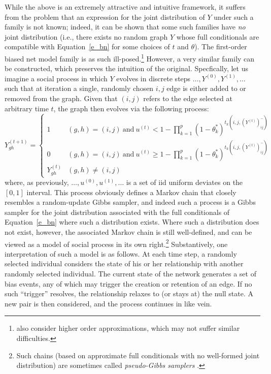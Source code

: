 \documentclass[11pt]{article}
\begin{document}
While the above is an extremely attractive and intuitive framework, it suffers from the problem that an expression for the joint distribution of $Y$ under such a family is not known; indeed, it can be shown that some such families have \emph{no} joint distribution (i.e., there exists no random graph $Y$ whose full conditionals are compatible with Equation~\ref{e_bn} for some choices of $t$ and $\theta$).  The first-order biased net model family is as such ill-posed.\footnote{\citet{skvoretz.et.al:sn:2004} also consider higher order approximations, which may not suffer similar difficulties.}  However, a very similar family can be constructed, which preserves the intuition of the original.  Specfically, let us imagine a social process in which $Y$ evolves in discrete steps $\ldots,Y^{(0)},Y^{(1)},\ldots$ such that at iteration a single, randomly chosen $i,j$ edge is either added to or removed from the graph.  Given that $(i,j)$ refers to the edge selected at arbitrary time $t$, the graph then evolves via the following process:
\begin{equation}
Y^{(t+1)}_{gh} = \begin{cases} 1 & (g,h)=(i,j) \ \mathrm{and}\ u^{(t)} < 1-\prod_{k=1}^p\left(1-\theta^*_k\right)^{t_k\left(i,j,\left(Y^{(t)}\right)^-_{ij}\right)} \\ 0 & (g,h)=(i,j) \ \mathrm{and}\ u^{(t)} \ge 1-\prod_{k=1}^p\left(1-\theta^*_k\right)^{t_k\left(i,j,\left(Y^{(t)}\right)^-_{ij}\right)} \\ Y_{gh}^{(t)} & (g,h) \neq (i,j)\end{cases} \label{e_pgibbs}
\end{equation}
where, as previously, $\ldots,u^{(0)},u^{(1)},\ldots$ is a set of iid uniform deviates on the $[0,1]$ interval.  This process obviously defines a Markov chain that closely resembles a random-update Gibbs sampler, and indeed such a process is a Gibbs sampler for the joint distribution associated with the full conditionals of Equation~\ref{e_bn} where such a distribution exists.  Where such a distribution does not exist, however, the associated Markov chain is still well-defined, and can be viewed as a model of social process in its own right.\footnote{Such chains (based on approximate full conditionals with no well-formed joint distribution) are sometimes called \emph{pseudo-Gibbs samplers} \citep{chen.ip:jscs:2014}.}  Substantively, one interpretation of such a model is as follows.  At each time step, a randomly selected individual considers the state of his or her relationship with another randomly selected individual.  The current state of the network generates a set of bias events, any of which may trigger the creation or retention of an edge.  If no such ``trigger'' resolves, the relationship relaxes to (or stays at) the null state.  A new pair is then considered, and the process continues in like vein.
\end{document}
